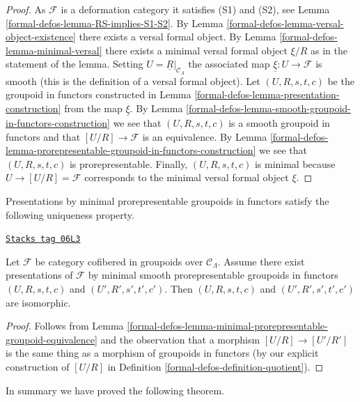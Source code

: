 \begin{proof}
As $\mathcal{F}$ is a deformation category it satisfies (S1) and (S2), see
Lemma \ref{formal-defos-lemma-RS-implies-S1-S2}.
By
Lemma \ref{formal-defos-lemma-versal-object-existence}
there exists a versal formal object. By
Lemma \ref{formal-defos-lemma-minimal-versal}
there exists a minimal versal formal object $\xi/R$ as in the statement
of the lemma. Setting
$U = \underline{R}|_{\mathcal{C}_\Lambda}$ the
associated map $\underline{\xi} : U \to \mathcal{F}$ is smooth (this is
the definition of a versal formal object).
Let $(U, R, s, t, c)$ be the groupoid in functors constructed in
Lemma \ref{formal-defos-lemma-presentation-construction}
from the map $\underline{\xi}$. By
Lemma \ref{formal-defos-lemma-smooth-groupoid-in-functors-construction}
we see that $(U, R, s, t, c)$ is a smooth groupoid in functors and that
$[U/R] \to \mathcal{F}$ is an equivalence. By
Lemma \ref{formal-defos-lemma-prorepresentable-groupoid-in-functors-construction}
we see that $(U, R, s, t, c)$ is prorepresentable.
Finally, $(U, R, s, t, c)$ is minimal because $U \to [U/R] = \mathcal{F}$
corresponds to the minimal versal formal object $\xi$.
\end{proof}

Presentations by minimal prorepresentable groupoids in functors satisfy the
following uniqueness property.

\begin{lemma}
\label{formal-defos-lemma-minimal-presentations-equivalent}
\href{https://stacks.math.columbia.edu/tag/06L3}{\texttt{Stacks tag 06L3}}

Let $\mathcal{F}$ be category cofibered in groupoids over
$\mathcal{C}_\Lambda$. Assume there exist presentations of
$\mathcal{F}$ by minimal smooth prorepresentable groupoids
in functors $(U, R, s, t, c)$ and $(U', R', s', t', c')$.
Then $(U, R, s, t, c)$ and $(U', R', s', t', c')$ are isomorphic.
\end{lemma}

\begin{proof}
Follows from
Lemma \ref{formal-defos-lemma-minimal-prorepresentable-groupoid-equivalence}
and the observation that a morphism
$[U/R] \to [U'/R']$ is the same thing as a morphism
of groupoids in functors (by our explicit construction of $[U/R]$ in
Definition \ref{formal-defos-definition-quotient}).
\end{proof}

In summary we have proved the following theorem.

